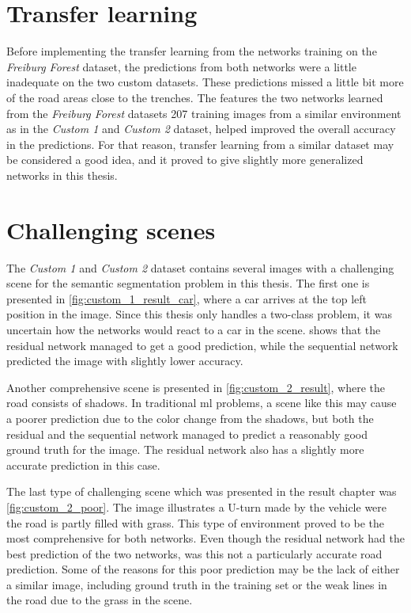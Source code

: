 \documentclass[USenglish]{ifimaster}  %
\begin{document}
\section{Transfer learning}
Before implementing the transfer learning from the networks training on the \textit{Freiburg Forest} dataset, the predictions from both networks were a little inadequate on the two custom datasets. These predictions missed a little bit more of the road areas close to the trenches. The features the two networks learned from the \textit{Freiburg Forest} datasets 207 training images from a similar environment as in the \textit{Custom 1} and \textit{Custom 2} dataset, helped improved the overall accuracy in the predictions. For that reason, transfer learning from a similar dataset may be considered a good idea, and it proved to give slightly more generalized networks in this thesis.  

\section{Challenging scenes}
The \textit{Custom 1} and \textit{Custom 2} dataset contains several images with a challenging scene for the semantic segmentation problem in this thesis. The first one is presented in \vref{fig:custom_1_result_car}, where a car arrives at the top left position in the image. Since this thesis only handles a two-class problem, it was uncertain how the networks would react to a car in the scene.  shows that the residual network managed to get a good prediction, while the sequential network predicted the image with slightly lower accuracy.

Another comprehensive scene is presented in \vref{fig:custom_2_result}, where the road consists of shadows. In traditional \ac{ml} problems, a scene like this may cause a poorer prediction due to the color change from the shadows, but both the residual and the sequential network managed to predict a reasonably good ground truth for the image. The residual network also has a slightly more accurate prediction in this case.

The last type of challenging scene which was presented in the result chapter was \vref{fig:custom_2_poor}. The image illustrates a U-turn made by the vehicle were the road is partly filled with grass. This type of environment proved to be the most comprehensive for both networks. Even though the residual network had the best prediction of the two networks, was this not a particularly accurate road prediction. Some of the reasons for this poor prediction may be the lack of either a similar image, including ground truth in the training set or the weak lines in the road due to the grass in the scene. 
\end{document}
